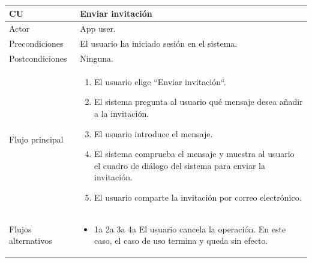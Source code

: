 \documentclass[twoside]{report}
\newcommand\addrow[2]{#1 &#2\\ }
\newcommand\addheading[2]{#1 &#2\\ \hline}
\newcommand\tabularhead{\begin{tabular}{lp{0.7\textwidth}}
\hline
}
\newenvironment{usecase}{\tabularhead}
{\hline\end{tabular}}
\begin{document}
\begin{usecase}
  \addheading{\textbf{CU\arabic{usecase}}}{Enviar invitación} 
  \addrow{Actor}{App user.}
  \addrow{Precondiciones}{El usuario ha iniciado sesión en el sistema.}
  \addrow{Postcondiciones}{Ninguna.}
  \addrow{Flujo principal}{
  		\begin{enumerate}
  		\item El usuario elige “Enviar invitación“. %
  		\item El sistema pregunta al usuario qué mensaje desea añadir a la invitación. %
  		\item El usuario introduce el mensaje. %
  		\item El sistema comprueba el mensaje y muestra al usuario el cuadro de diálogo del sistema para enviar la invitación. %
  		\item El usuario comparte la invitación por correo electrónico. %
  		\end{enumerate}
  }
  \addrow{Flujos alternativos}{
  		\begin{itemize}
  		\item 1a 2a 3a 4a El usuario cancela la operación. En este caso, el caso de uso termina y queda sin efecto.
  		\end{itemize}
  }
\end{usecase}\\

\vspace{0.5cm}
\end{document}
